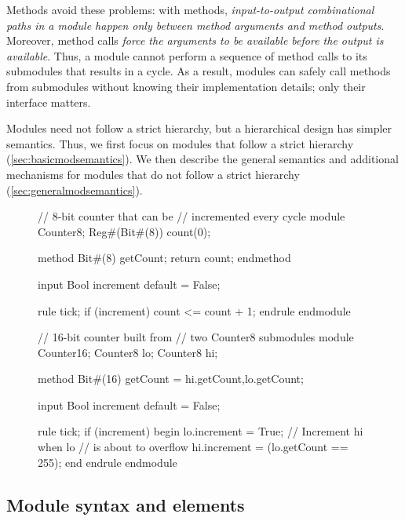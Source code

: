 Methods avoid these problems: with methods,
\emph{input-to-output combinational paths in a module happen only between method arguments and method outputs}.
Moreover, method calls \emph{force the arguments to be available before the output is available}.
Thus, a module cannot perform a sequence of method calls to its submodules that results in a cycle.
As a result, modules can safely call methods from submodules without knowing their implementation details;
only their interface matters.

Modules need not follow a strict hierarchy, but a hierarchical design has simpler semantics.
Thus, we first focus on modules that follow a strict hierarchy (\autoref{sec:basicmodsemantics}). %
We then describe the general semantics and additional mechanisms for modules that do not follow a strict hierarchy (\autoref{sec:generalmodsemantics}).

\begin{figure}
\vspace{-4em}
\begin{mscode}
// 8-bit counter that can be
// incremented every cycle
module Counter8;
  Reg#(Bit#(8)) count(0);

  method Bit#(8) getCount;
    return count;
  endmethod

  input Bool increment
    default = False;

  rule tick;
    if (increment)
      count <= count + 1;
  endrule
endmodule

// 16-bit counter built from 
// two Counter8 submodules
module Counter16;
  Counter8 lo;
  Counter8 hi;

  method Bit#(16) getCount =
   {hi.getCount,lo.getCount};

  input Bool increment
    default = False;

  rule tick;
    if (increment) begin
      lo.increment = True;
      // Increment hi when lo
      // is about to overflow
      hi.increment =
       (lo.getCount == 255);
    end
  endrule
endmodule
\end{mscode}
\vspace{-9em}
\end{figure}

\subsection{Module syntax and elements}
\label{sec:modulesyntax}
\label{sec:submodules}

